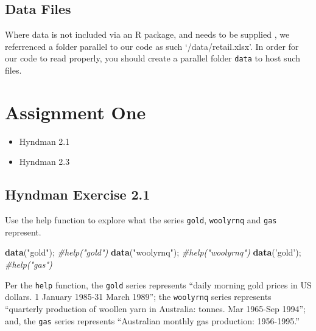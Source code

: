 \documentclass[openany]{book}
\newenvironment{Shaded}{\begin{snugshade}}{\end{snugshade}}
\newcommand{\CommentTok}[1]{\textcolor[rgb]{0.56,0.35,0.01}{\textit{#1}}}
\newcommand{\KeywordTok}[1]{\textcolor[rgb]{0.13,0.29,0.53}{\textbf{#1}}}
\newcommand{\NormalTok}[1]{#1}
\newcommand{\StringTok}[1]{\textcolor[rgb]{0.31,0.60,0.02}{#1}}
\providecommand{\tightlist}{%
  \setlength{\itemsep}{0pt}\setlength{\parskip}{0pt}}
\renewenvironment{quote}{\begin{myquote}}{\end{myquote}}
\begin{document}
\hypertarget{data-files}{%
\section{Data Files}\label{data-files}}

Where data is not included via an R package, and needs to be supplied , we referrenced a folder parallel to our code as such `/data/retail.xlsx'. In order for our code to read properly, you should create a parallel folder \texttt{data} to host such files.

\hypertarget{assignment-one}{%
\chapter{Assignment One}\label{assignment-one}}

\begin{itemize}
\tightlist
\item
  Hyndman 2.1\\
\item
  Hyndman 2.3
\end{itemize}

\hypertarget{hyndman-exercise-2.1}{%
\section{Hyndman Exercise 2.1}\label{hyndman-exercise-2.1}}

\begin{quote}
Use the help function to explore what the series \texttt{gold}, \texttt{woolyrnq} and \texttt{gas} represent.
\end{quote}

\begin{Shaded}
\begin{Highlighting}[]
\KeywordTok{data}\NormalTok{(}\StringTok{"gold"}\NormalTok{); }\CommentTok{#help("gold")}
\KeywordTok{data}\NormalTok{(}\StringTok{"woolyrnq"}\NormalTok{); }\CommentTok{#help("woolyrnq")}
\KeywordTok{data}\NormalTok{(}\StringTok{'gold'}\NormalTok{); }\CommentTok{#help("gas")}
\end{Highlighting}
\end{Shaded}

Per the \texttt{help} function, the \texttt{gold} series represents ``daily morning gold prices in US dollars. 1 January 1985-31 March 1989''; the \texttt{woolyrnq} series represents ``quarterly production of woollen yarn in Australia: tonnes. Mar 1965-Sep 1994''; and, the \texttt{gas} series represents ``Australian monthly gas production: 1956-1995.''
\end{document}
